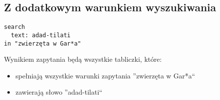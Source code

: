 \subsection{Z dodatkowym warunkiem wyszukiwania}
\begin{verbatim}
search
  text: adad-tilati
in "zwierzęta w Gar*a"
\end{verbatim}
Wynikiem zapytania będą wszystkie tabliczki, które:
\begin{itemize}
 \item spełniają wszystkie warunki zapytania ''zwierzęta w Gar*a``
\item zawierają słowo ''adad-tilati``
\end{itemize}

